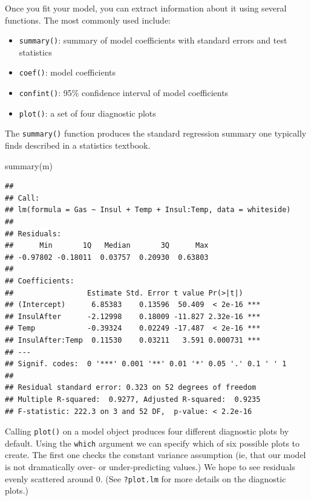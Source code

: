 \documentclass[
]{book}
\newenvironment{Shaded}{\begin{snugshade}}{\end{snugshade}}
\newcommand{\FunctionTok}[1]{\textcolor[rgb]{0.00,0.00,0.00}{#1}}
\newcommand{\NormalTok}[1]{#1}
\providecommand{\tightlist}{%
  \setlength{\itemsep}{0pt}\setlength{\parskip}{0pt}}
\begin{document}
Once you fit your model, you can extract information about it using several functions. The most commonly used include:

\begin{itemize}
\tightlist
\item
  \texttt{summary()}: summary of model coefficients with standard errors and test statistics
\item
  \texttt{coef()}: model coefficients
\item
  \texttt{confint()}: 95\% confidence interval of model coefficients
\item
  \texttt{plot()}: a set of four diagnostic plots
\end{itemize}

The \texttt{summary()} function produces the standard regression summary one typically finds described in a statistics textbook.

\begin{Shaded}
\begin{Highlighting}[]
\FunctionTok{summary}\NormalTok{(m)}
\end{Highlighting}
\end{Shaded}

\begin{verbatim}
## 
## Call:
## lm(formula = Gas ~ Insul + Temp + Insul:Temp, data = whiteside)
## 
## Residuals:
##      Min       1Q   Median       3Q      Max 
## -0.97802 -0.18011  0.03757  0.20930  0.63803 
## 
## Coefficients:
##                 Estimate Std. Error t value Pr(>|t|)    
## (Intercept)      6.85383    0.13596  50.409  < 2e-16 ***
## InsulAfter      -2.12998    0.18009 -11.827 2.32e-16 ***
## Temp            -0.39324    0.02249 -17.487  < 2e-16 ***
## InsulAfter:Temp  0.11530    0.03211   3.591 0.000731 ***
## ---
## Signif. codes:  0 '***' 0.001 '**' 0.01 '*' 0.05 '.' 0.1 ' ' 1
## 
## Residual standard error: 0.323 on 52 degrees of freedom
## Multiple R-squared:  0.9277, Adjusted R-squared:  0.9235 
## F-statistic: 222.3 on 3 and 52 DF,  p-value: < 2.2e-16
\end{verbatim}

Calling \texttt{plot()} on a model object produces four different diagnostic plots by default. Using the \texttt{which} argument we can specify which of six possible plots to create. The first one checks the constant variance assumption (ie, that our model is not dramatically over- or under-predicting values.) We hope to see residuals evenly scattered around 0. (See \texttt{?plot.lm} for more details on the diagnostic plots.)
\end{document}
